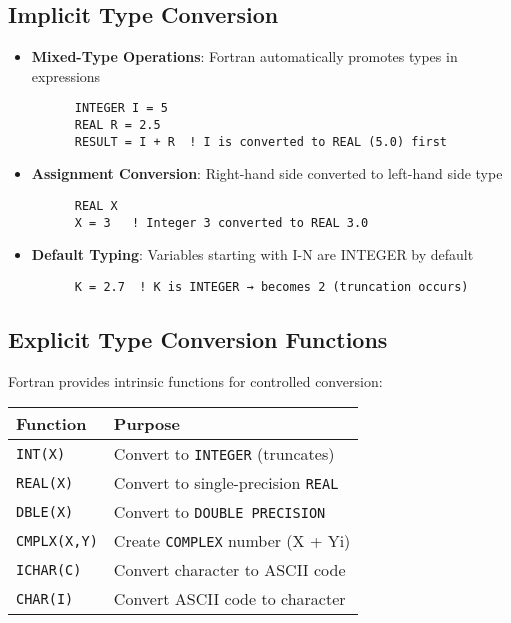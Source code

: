 \documentclass{book}
\begin{document}
\subsection*{Implicit Type Conversion}
\begin{itemize}
    \item \textbf{Mixed-Type Operations}: Fortran automatically promotes types in expressions
    \begin{verbatim}
      INTEGER I = 5
      REAL R = 2.5
      RESULT = I + R  ! I is converted to REAL (5.0) first
    \end{verbatim}
    
    \item \textbf{Assignment Conversion}: Right-hand side converted to left-hand side type
    \begin{verbatim}
      REAL X
      X = 3   ! Integer 3 converted to REAL 3.0
    \end{verbatim}
    
    \item \textbf{Default Typing}: Variables starting with I-N are INTEGER by default
    \begin{verbatim}
      K = 2.7  ! K is INTEGER → becomes 2 (truncation occurs)
    \end{verbatim}
\end{itemize}

\subsection*{Explicit Type Conversion Functions}
Fortran provides intrinsic functions for controlled conversion:

\begin{center}
\begin{tabular}{|l|l|}
\hline
\textbf{Function} & \textbf{Purpose} \\ 
\hline
\texttt{INT(X)} & Convert to \texttt{INTEGER} (truncates) \\
\texttt{REAL(X)} & Convert to single-precision \texttt{REAL} \\
\texttt{DBLE(X)} & Convert to \texttt{DOUBLE PRECISION} \\
\texttt{CMPLX(X,Y)} & Create \texttt{COMPLEX} number (X + Yi) \\
\texttt{ICHAR(C)} & Convert character to ASCII code \\
\texttt{CHAR(I)} & Convert ASCII code to character \\
\hline
\end{tabular}
\end{center}
\end{document}
